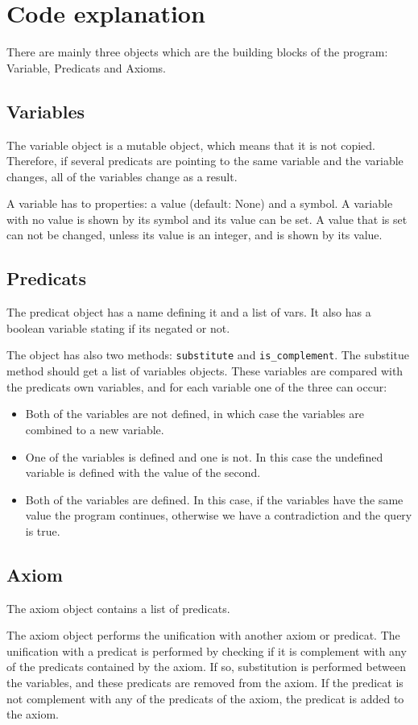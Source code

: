 \documentclass{article}                     %
\begin{document}
	\section{Code explanation}
	There are mainly three objects which are the building blocks of the program: Variable, Predicats and Axioms.
	\subsection{Variables}
	The variable object is a mutable object, which means that it is not copied. Therefore, if several predicats are pointing to the same variable and the variable changes, all of the variables change as a result.
	
	A variable has to properties: a value (default: None)  and a symbol. A variable with no value is shown by its symbol and its value can be set. A value that is set can not be changed, unless its value is an integer, and is shown by its value.
	
	\subsection{Predicats}
	The predicat object has a name defining it and a list of vars. It also has a boolean variable stating if its negated or not.
	
	The object has also two methods: \texttt{substitute} and \texttt{is\_complement}. The substitue method should get a list of variables objects. These variables are compared with the predicats own variables, and for each variable one of the three can occur:
	\begin{itemize}
		\item Both of the variables are not defined, in which case the variables are combined to a new variable.
		\item One of the variables is defined and one is not. In this case the undefined variable is defined with the value of the second.
		\item Both of the variables are defined. In this case, if the variables have the same value the program continues, otherwise we have a contradiction and the query is true.
	\end{itemize}
	
	\subsection{Axiom}
	The axiom object contains a list of predicats.
	
	The axiom object performs the unification with another axiom or predicat. The unification with a predicat is performed by checking if it is complement with any of the predicats contained by the axiom. If so, substitution is performed between the variables, and these predicats are removed from the axiom. If the predicat is not complement with any of the predicats of the axiom, the predicat is added to the axiom. 
	
\end{document}

